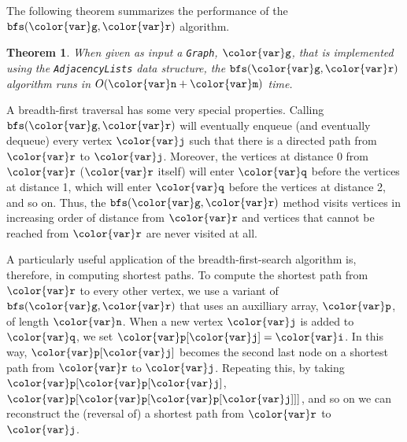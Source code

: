 \documentclass[10pt]{book}
\theoremstyle{plain}
\newtheorem{thm}{Theorem}[chapter]
\newcommand{\thmlabel}[1]{\label{thm:#1}}
\theoremstyle{definition}
\begin{document}
The following theorem summarizes the performance of the \ensuremath{\mathtt{bfs({\color{var}g},{\color{var}r})}} algorithm.
\begin{thm}\thmlabel{bfs-graph}
  When given as input a \texttt{Graph}, \ensuremath{\mathtt{{\color{var}g}}}, that is implemented using the
  \texttt{AdjacencyLists} data structure, the \ensuremath{\mathtt{bfs({\color{var}g},{\color{var}r})}} algorithm runs in $O(\ensuremath{\mathtt{{\color{var}n}}}+\ensuremath{\mathtt{{\color{var}m}}})$
  time.
\end{thm}

A breadth-first traversal has some very special properties.  Calling
\ensuremath{\mathtt{bfs({\color{var}g},{\color{var}r})}} will eventually enqueue (and eventually dequeue) every vertex
\ensuremath{\mathtt{{\color{var}j}}} such that there is a directed path from \ensuremath{\mathtt{{\color{var}r}}} to \ensuremath{\mathtt{{\color{var}j}}}.  Moreover,
the vertices at distance 0 from \ensuremath{\mathtt{{\color{var}r}}} (\ensuremath{\mathtt{{\color{var}r}}} itself) will enter \ensuremath{\mathtt{{\color{var}q}}} before
the vertices at distance 1, which will enter \ensuremath{\mathtt{{\color{var}q}}} before the vertices at
distance 2, and so on.  Thus, the \ensuremath{\mathtt{bfs({\color{var}g},{\color{var}r})}} method visits vertices
in increasing order of distance from \ensuremath{\mathtt{{\color{var}r}}} and vertices that cannot be
reached from \ensuremath{\mathtt{{\color{var}r}}} are never visited at all.

A particularly useful application of the breadth-first-search algorithm
is, therefore, in computing shortest paths.  To compute the shortest
path from \ensuremath{\mathtt{{\color{var}r}}} to every other vertex, we use a variant of \ensuremath{\mathtt{bfs({\color{var}g},{\color{var}r})}}
that uses an auxilliary array, \ensuremath{\mathtt{{\color{var}p}}}, of length \ensuremath{\mathtt{{\color{var}n}}}.  When a new vertex
\ensuremath{\mathtt{{\color{var}j}}} is added to \ensuremath{\mathtt{{\color{var}q}}}, we set \ensuremath{\mathtt{{\color{var}p}[{\color{var}j}]={\color{var}i}}}.  In this way, \ensuremath{\mathtt{{\color{var}p}[{\color{var}j}]}} becomes the
second last node on a shortest path from \ensuremath{\mathtt{{\color{var}r}}} to \ensuremath{\mathtt{{\color{var}j}}}.  Repeating this,
by taking \ensuremath{\mathtt{{\color{var}p}[{\color{var}p}[{\color{var}j}]}}, \ensuremath{\mathtt{{\color{var}p}[{\color{var}p}[{\color{var}p}[{\color{var}j}]]]}}, and so on we can reconstruct the
(reversal of) a shortest path from \ensuremath{\mathtt{{\color{var}r}}} to \ensuremath{\mathtt{{\color{var}j}}}.
\end{document}
